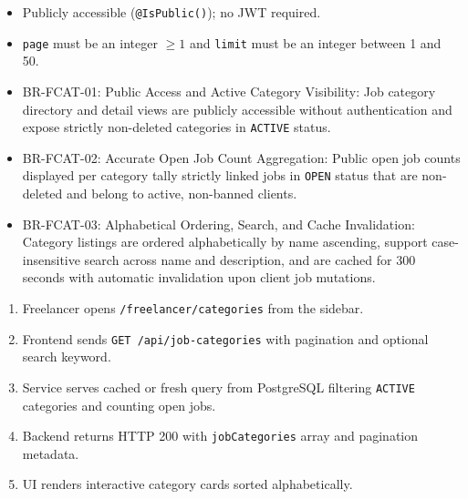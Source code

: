 \begin{itemize}[leftmargin=1.6em,topsep=3pt,itemsep=2pt,parsep=0pt,label=$\bullet$]
    \item Publicly accessible (\texttt{@IsPublic()}); no JWT required.
    \item \texttt{page} must be an integer $\ge 1$ and \texttt{limit} must be an integer between 1 and 50.
\end{itemize}

\begin{itemize}[leftmargin=1.6em,topsep=3pt,itemsep=2pt,parsep=0pt,label=$\bullet$]\brrulelist
    \item BR-FCAT-01: Public Access and Active Category Visibility: Job category directory and detail views are publicly accessible without authentication and expose strictly non-deleted categories in \texttt{ACTIVE} status.
    \item BR-FCAT-02: Accurate Open Job Count Aggregation: Public open job counts displayed per category tally strictly linked jobs in \texttt{OPEN} status that are non-deleted and belong to active, non-banned clients.
    \item BR-FCAT-03: Alphabetical Ordering, Search, and Cache Invalidation: Category listings are ordered alphabetically by name ascending, support case-insensitive search across name and description, and are cached for 300 seconds with automatic invalidation upon client job mutations.
\end{itemize}

\begin{enumerate}[leftmargin=1.8em,topsep=3pt,itemsep=2pt,parsep=0pt]
    \item Freelancer opens \texttt{/freelancer/categories} from the sidebar.
    \item Frontend sends \texttt{GET /api/job-categories} with pagination and optional search keyword.
    \item Service serves cached or fresh query from PostgreSQL filtering \texttt{ACTIVE} categories and counting open jobs.
    \item Backend returns HTTP 200 with \texttt{jobCategories} array and pagination metadata.
    \item UI renders interactive category cards sorted alphabetically.
\end{enumerate}

